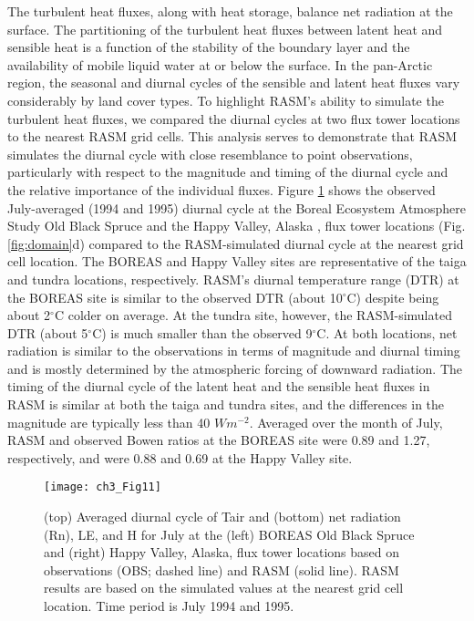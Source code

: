 The turbulent heat fluxes, along with heat storage, balance net radiation at the surface.
The partitioning of the turbulent heat fluxes between latent heat and sensible heat is a function of the stability of the boundary layer and the availability of mobile liquid water at or below the surface.
In the pan-Arctic region, the seasonal and diurnal cycles of the sensible and latent heat fluxes vary considerably by land cover types.
To highlight RASM's ability to simulate the turbulent heat fluxes, we compared the diurnal cycles at two flux tower locations to the nearest RASM grid cells.
This analysis serves to demonstrate that RASM simulates the diurnal cycle with close resemblance to point observations, particularly with respect to the magnitude and timing of the diurnal cycle and the relative importance of the individual fluxes.
Figure \ref{fig:diurnal_cycle} shows the observed July-averaged (1994 and 1995) diurnal cycle at the Boreal Ecosystem Atmosphere Study \citep[BOREAS; ][]{Sellers_1997} Old Black Spruce \citep{Barr_2006} and the Happy Valley, Alaska \citep{Eugster_2000}, flux tower locations (Fig. \ref{fig:domain}d) compared to the RASM-simulated diurnal cycle at the nearest grid cell location.
The BOREAS and Happy Valley sites are representative of the taiga and tundra locations, respectively.
RASM's diurnal temperature range (DTR) at the BOREAS site is similar to the observed DTR (about 10$^{\circ}$C) despite being about 2$^{\circ}$C colder on average.
At the tundra site, however, the RASM-simulated DTR (about 5$^{\circ}$C) is much smaller than the observed 9$^{\circ}$C.
At both locations, net radiation is similar to the observations in terms of magnitude and diurnal timing and is mostly determined by the atmospheric forcing of downward radiation.
The timing of the diurnal cycle of the latent heat and the sensible heat fluxes in RASM is similar at both the taiga and tundra sites, and the differences in the magnitude are typically less than 40 $W m^{-2}$.
Averaged over the month of July, RASM and observed Bowen ratios at the BOREAS site were 0.89 and 1.27, respectively, and were 0.88 and 0.69 at the Happy Valley site.

\begin{figure}
  \centering
  \texttt{[image: ch3\_Fig11]}
  \caption{(top) Averaged diurnal cycle of Tair and (bottom) net radiation (Rn), LE, and H for July at the (left) BOREAS Old Black Spruce and (right) Happy Valley, Alaska, flux tower locations based on observations (OBS; dashed line) and RASM (solid line).
  RASM results are based on the simulated values at the nearest grid cell location.
  Time period is July 1994 and 1995.}
  \label{fig:diurnal_cycle}
\end{figure}

